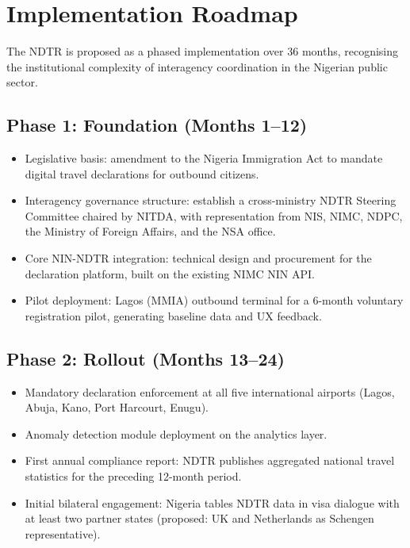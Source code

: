 \documentclass[11pt]{article}
\begin{document}
\section{Implementation Roadmap}
\label{sec:roadmap}

The NDTR is proposed as a phased implementation over 36 months,
recognising the institutional complexity of interagency coordination
in the Nigerian public sector.

\subsection{Phase 1: Foundation (Months 1--12)}

\begin{itemize}
  \item Legislative basis: amendment to the Nigeria Immigration Act to
  mandate digital travel declarations for outbound citizens.
  \item Interagency governance structure: establish a cross-ministry
  NDTR Steering Committee chaired by NITDA, with representation from
  NIS, NIMC, NDPC, the Ministry of Foreign Affairs, and the NSA office.
  \item Core NIN-NDTR integration: technical design and procurement for
  the declaration platform, built on the existing NIMC NIN API.
  \item Pilot deployment: Lagos (MMIA) outbound terminal for a
  6-month voluntary registration pilot, generating baseline data
  and UX feedback.
\end{itemize}

\subsection{Phase 2: Rollout (Months 13--24)}

\begin{itemize}
  \item Mandatory declaration enforcement at all five international
  airports (Lagos, Abuja, Kano, Port Harcourt, Enugu).
  \item Anomaly detection module deployment on the analytics layer.
  \item First annual compliance report: NDTR publishes aggregated
  national travel statistics for the preceding 12-month period.
  \item Initial bilateral engagement: Nigeria tables NDTR data in
  visa dialogue with at least two partner states (proposed: UK and
  Netherlands as Schengen representative).
\end{itemize}
\end{document}
